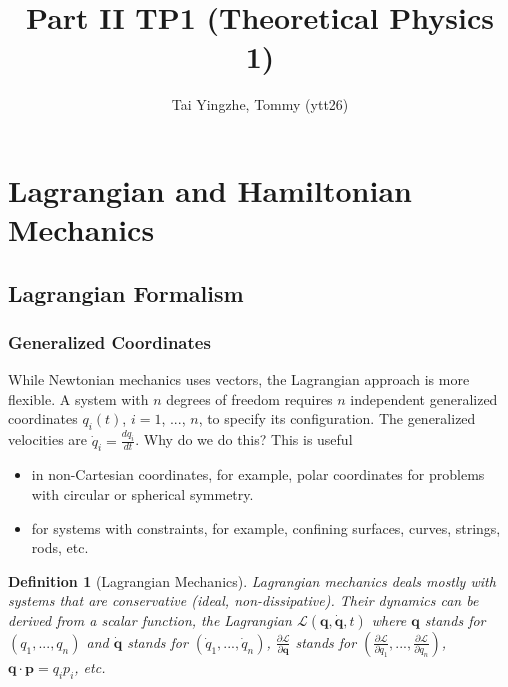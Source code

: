 \documentclass[a4paper]{article}
\title{\textbf{Part II TP1 (Theoretical Physics 1)}}
\author{Tai Yingzhe, Tommy (ytt26)}
\date{}
\newtheorem{defi}{Definition}[section]
\theoremstyle{new}
\begin{document}
\maketitle
\tableofcontents
\newpage
\section{Lagrangian and Hamiltonian Mechanics}
\subsection{Lagrangian Formalism}
\subsubsection{Generalized Coordinates}
While Newtonian mechanics uses vectors, the Lagrangian approach is more flexible. A system with $n$ degrees of freedom requires $n$ independent generalized coordinates $q_i(t)$, $i=1$, ..., $n$, to specify its configuration. The generalized velocities are $\dot{q}_i=\frac{dq_i}{dt}$. Why do we do this? This is useful
\begin{itemize}
    \item in non-Cartesian coordinates, for example, polar coordinates for problems with circular or spherical symmetry. 
    \item for systems with constraints, for example, confining surfaces, curves, strings, rods, etc.
\end{itemize}
\begin{defi}[Lagrangian Mechanics]
Lagrangian mechanics deals mostly with systems that are conservative (ideal, non-dissipative). Their dynamics can be derived from a scalar function, the Lagrangian $\mathcal{L}(\mathbf{q},\mathbf{\dot{q}},t)$ where $\mathbf{q}$ stands for $(q_1,...,q_n)$ and $\mathbf{\dot{q}}$ stands for $(\dot{q}_1,...,\dot{q}_n)$, $\frac{\partial\mathcal{L}}{\partial\mathbf{q}}$ stands for $(\frac{\partial\mathcal{L}}{\partial q_1},...,\frac{\partial\mathcal{L}}{\partial q_n})$, $\mathbf{q}\cdot\mathbf{p}=q_ip_i$, etc.
\end{defi}
\end{document}
